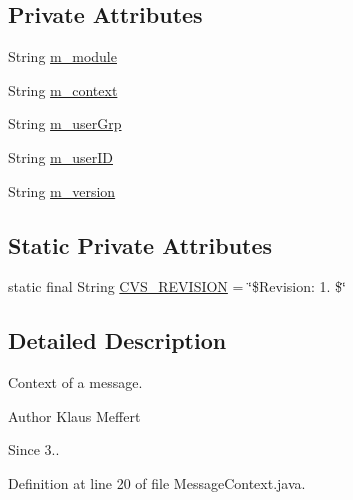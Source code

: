 \subsection*{Private Attributes}
\begin{DoxyCompactItemize}
\item 
String \hyperlink{classorg_1_1jgap_1_1distr_1_1grid_1_1_message_context_af9cf96344cf896a761bd2b0b0c64ab49}{m\-\_\-module}
\item 
String \hyperlink{classorg_1_1jgap_1_1distr_1_1grid_1_1_message_context_a5dff978ddd347313874f39dd1e2b0c21}{m\-\_\-context}
\item 
String \hyperlink{classorg_1_1jgap_1_1distr_1_1grid_1_1_message_context_adc0bc2f35dc2f24e128155957b430dad}{m\-\_\-user\-Grp}
\item 
String \hyperlink{classorg_1_1jgap_1_1distr_1_1grid_1_1_message_context_ae6f07d428cf91699264f668e6988cd25}{m\-\_\-user\-I\-D}
\item 
String \hyperlink{classorg_1_1jgap_1_1distr_1_1grid_1_1_message_context_a3d365f65a9fb2ae0feffd558337a7c50}{m\-\_\-version}
\end{DoxyCompactItemize}
\subsection*{Static Private Attributes}
\begin{DoxyCompactItemize}
\item 
static final String \hyperlink{classorg_1_1jgap_1_1distr_1_1grid_1_1_message_context_a89292919f7fda1fa9708c34da0be8642}{C\-V\-S\-\_\-\-R\-E\-V\-I\-S\-I\-O\-N} = \char`\"{}\$Revision\-: 1. \$\char`\"{}
\end{DoxyCompactItemize}


\subsection{Detailed Description}
Context of a message.

\begin{DoxyAuthor}{Author}
Klaus Meffert 
\end{DoxyAuthor}
\begin{DoxySince}{Since}
3.. 
\end{DoxySince}


Definition at line 20 of file Message\-Context.\-java.



